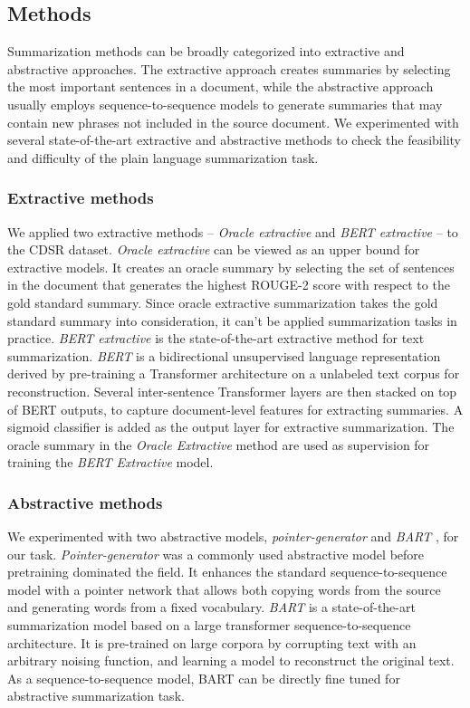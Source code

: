 \documentclass[letterpaper, table]{article}
\begin{document}
\subsection{Methods}
Summarization methods can be broadly categorized into extractive and abstractive approaches. The extractive approach
creates summaries by selecting the most important sentences in a document,
while the abstractive approach usually employs sequence-to-sequence models to generate summaries that may contain new phrases not included in the source document. We experimented with several state-of-the-art extractive and abstractive methods to check the feasibility and difficulty of the plain language summarization task.
\subsubsection{Extractive methods}
We applied two extractive methods -- \textit{Oracle extractive} and \textit{BERT extractive} \cite{liu2019text} -- to the CDSR dataset. \textit{Oracle extractive} can be viewed as an upper bound for extractive models. It creates an oracle summary by selecting the set of sentences in the document that generates the highest ROUGE-2 score with respect to the gold standard summary. Since oracle extractive summarization takes the gold standard summary into consideration, it can't be applied summarization tasks in practice. \textit{BERT extractive} is the state-of-the-art extractive method for text summarization. \textit{BERT} \cite{devlin2018bert} is a bidirectional unsupervised language representation derived by pre-training a Transformer architecture on a unlabeled text corpus for reconstruction. Several inter-sentence Transformer layers are then stacked on top of BERT outputs, to capture document-level features for extracting summaries. A sigmoid classifier is added as the output layer for extractive summarization. The oracle summary in the \textit{Oracle Extractive} method are used as supervision for training the \textit{BERT Extractive} model.
\subsubsection{Abstractive methods}
We experimented with two abstractive models, \textit{pointer-generator} \cite{see2017get} and \textit{BART} \cite{lewis2019bart}, for our task. \textit{Pointer-generator} was a commonly used abstractive model before pretraining dominated the field. It enhances the standard sequence-to-sequence model with a pointer network that allows both copying words from the source and generating words from a fixed vocabulary. \textit{BART} is a state-of-the-art summarization model based on a large transformer sequence-to-sequence architecture. It is pre-trained on large corpora by corrupting text with an arbitrary noising function, and learning a model to reconstruct the original text.
As a sequence-to-sequence model, BART can be directly fine tuned for abstractive summarization task.
\end{document}
